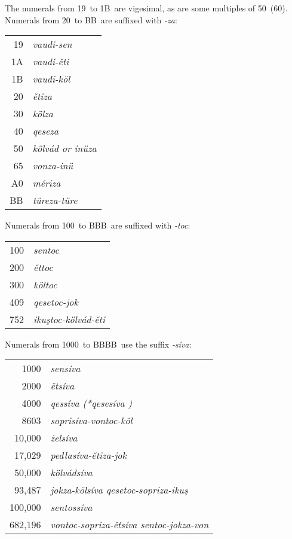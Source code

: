 \documentclass[grammar]{subfiles}
\begin{document}
	\newpage
	The numerals from 19\duo\ to 1B\duo\ are vigesimal, as are some multiples of 50\duo\ (60\dec). Numerals from 20\duo\ to BB\duo\ are suffixed with \textit{-za}:

	\begin{exe}
		\ex
		\begin{tabular}[t]{r >{\itshape}l}
			19\duo & vaudi-sen\\
			1A\duo & vaudi-ěti\\
			1B\duo & vaudi-köl\\
			20\duo & ětiza\\
			30\duo & kölza\\
			40\duo & qeseza\\
			50\duo & kölvád \textup{or} inüza\\
			65\duo & vonza-inü\\
			A0\duo & mériza\\
			BB\duo & türeza-türe\\
		\end{tabular}
	\end{exe}

	Numerals from 100\duo\ to BBB\duo\ are suffixed with \textit{-toc}:

	\begin{exe}
		\ex
		\begin{tabular}[t]{r >{\itshape}l}
			100\duo & sentoc\\
			200\duo & ěttoc\\
			300\duo & költoc\\
			409\duo & qesetoc-jok\\
			752\duo & ikuştoc-kölvád-ěti\\
		\end{tabular}
	\end{exe}

	Numerals from 1000\duo\ to BBBB\duo\  use the suffix \textit{-síva}:

	\begin{exe}
		\ex
		\begin{tabular}[t]{r >{\itshape}l}
			1000\duo    & sensíva\\
			2000\duo    & ětsíva\\
			4000\duo    & qessíva \textup{(*\emph{qesesíva} )}\\
			8603\duo    & soprisíva-vontoc-köl\\
			10,000\duo  & żelsíva\\
			17,029\duo  & pedłasíva-ětiza-jok\\
			50,000\duo  & kölvádsíva\\
			93,487\duo  & jokza-kölsíva qesetoc-sopriza-ikuş\\
			100,000\duo & sentossíva\\
			682,196\duo & vontoc-sopriza-ětsíva sentoc-jokza-von\\
		\end{tabular}
	\end{exe}
\end{document}
